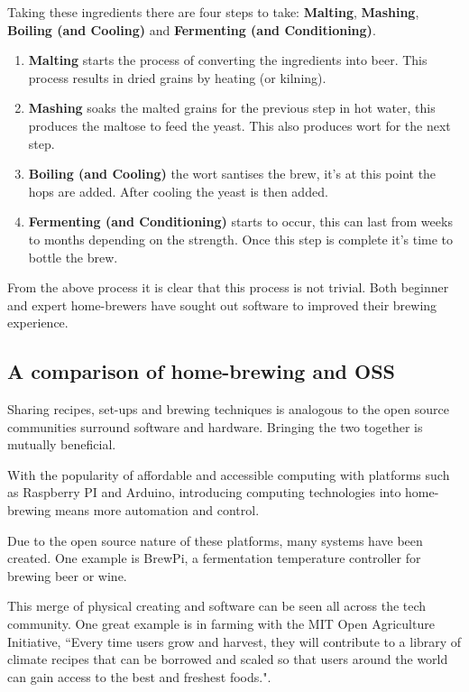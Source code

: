 Taking these ingredients there are four steps to take: \textbf{Malting}, \textbf{Mashing}, \textbf{Boiling (and Cooling)} and \textbf{Fermenting (and Conditioning)}.

\begin{enumerate}
  \item \textbf{Malting} starts the process of converting the ingredients into beer. This process results in dried grains by heating (or kilning).
  \item \textbf{Mashing} soaks the malted grains for the previous step in hot water, this produces the maltose to feed the yeast. This also produces wort for the next step.
  \item \textbf{Boiling (and Cooling)} the wort santises the brew, it's at this point the hops are added. After cooling the yeast is then added.
  \item \textbf{Fermenting (and Conditioning)} starts to occur, this can last from weeks to months depending on the strength. Once this step is complete it's time to bottle the brew.
\end{enumerate}

From the above process it is clear that this process is not trivial. Both beginner and expert home-brewers have sought out software to improved their brewing experience.

\subsection{A comparison of home-brewing and OSS} \label{l-r--compare-home-brewing-and-oss}

Sharing recipes, set-ups and brewing techniques is analogous to the open source communities surround software and hardware. Bringing the two together is mutually beneficial.

With the popularity of affordable and accessible computing with platforms such as Raspberry PI and Arduino, introducing computing technologies into home-brewing means more automation and control.

Due to the open source nature of these platforms, many systems have been created. One example is BrewPi, a fermentation temperature controller for brewing beer or wine. \cite{brewpi}

This merge of physical creating and software can be seen all across the tech community. One great example is in farming with the MIT Open Agriculture Initiative, ``Every time users grow and harvest, they will contribute to a library of climate recipes that can be borrowed and scaled so that users around the world can gain access to the best and freshest foods.". \cite{climate_recipes}


